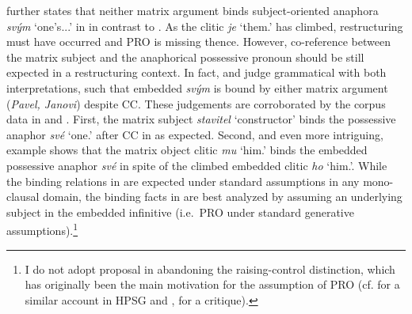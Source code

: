 \documentclass[output=paper,colorlinks,citecolor=brown]{langscibook}
\begin{document}
\noindent \citet[114--115]{Rezac2005} further states that neither matrix argument binds subject-oriented anaphora \textit{svým} ‘one’s.{\POSS.\PL.\DAT}’ in  in contrast to . As the clitic \textit{je} ‘them.{\ACC}’ has climbed, restructuring must have occurred and PRO is missing thence. However, co-reference between the matrix subject and the anaphorical possessive pronoun should be still expected in a restructuring context. In fact, \citet{Dotlačil2007} and \citet{Skoumalova2005} judge  grammatical with both interpretations, such that embedded \textit{svým} is bound by either matrix argument (\textit{Pavel, Janovi}) despite CC. These judgements are corroborated by the corpus data in  and . First, the matrix subject \textit{stavitel} ‘constructor’ binds the possessive anaphor \textit{své} ‘one.{\POSS}’ after CC in  as expected. Second, and even more intriguing, example  shows that the matrix object clitic \textit{mu} ‘him.{\DAT}’ binds the embedded possessive anaphor \textit{své} in spite of the climbed embedded clitic \textit{ho} ‘him.{\ACC}’. While the binding relations in  are expected under standard assumptions in any mono-clausal domain, the binding facts in  are best analyzed by assuming an underlying subject in the embedded infinitive (i.e. PRO under standard generative assumptions).\footnote{I do not adopt  proposal in abandoning the raising-control distinction, which has originally been the main motivation for the assumption of PRO (cf. \citealt{PrzepiórkowskiRosen2005} for a similar account in HPSG and \citealt{CulicoverJackendoff2001}, \citealt{Landau2003} for a critique).}


\ea\label{kul:ex:pavel-prikazal}
\z
\z
\end{document}
